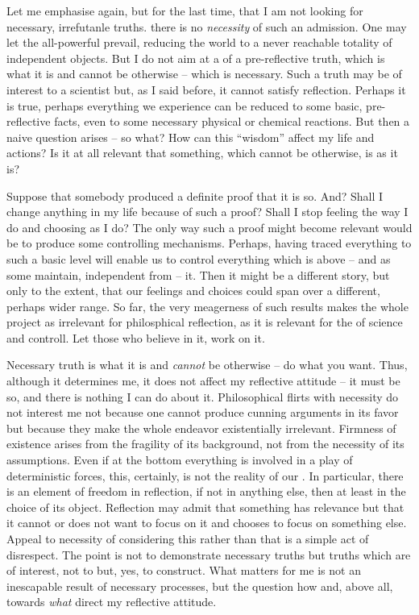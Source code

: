 {\pa
Let me emphasise again, but for the last time, that I am not looking for
necessary, irrefutanle truths. there is no {\em necessity} of such an
admission. One may let the all-powerful  prevail,
reducing the world to a never reachable totality of independent objects. But
I do not aim at a  of a pre-reflective truth, which is
what it is and cannot be otherwise -- which is necessary. Such a truth may be
of interest to a scientist but, as I said before, it cannot satisfy
reflection.  Perhaps it is true, perhaps everything we experience can be
reduced to some basic, pre-reflective facts, even to some necessary physical
or chemical reactions. But then a naive question arises -- so what?  How can
this ``wisdom'' affect my life and actions? Is it at all relevant that
something, which cannot be otherwise, is as it is? 

Suppose that somebody produced a definite proof that it is so. And? Shall I
change anything in my life because of such a proof?  Shall I stop feeling the
way I do and choosing as I do? The only way such a proof might become
relevant would be to produce some controlling mechanisms.  Perhaps, having
traced everything to such a basic level will enable us to control everything
which is above -- and as some maintain, independent from -- it. Then it might
be a different story, but only to the extent, that our feelings and choices
could span over a different, perhaps wider range.  So far, the very
meagerness of such results makes the whole project as irrelevant for
philosphical reflection, as it is relevant for the  of science and controll. Let those who believe in it, work on it.

Necessary truth is what it is and {\em cannot} be otherwise -- do what you
want.  Thus, although it determines me, it does not affect my reflective
attitude -- it must be so, and there is nothing I can do about
it. Philosophical flirts with necessity do not interest me not because one
cannot produce cunning arguments in its favor but because they make the whole
endeavor existentially irrelevant. Firmness of existence arises from the
fragility of its background, not from the necessity of its assumptions.  Even
if at the bottom everything is involved in a play of deterministic forces,
this, certainly, is not the reality of our . In particular, there
is an element of freedom in reflection, if not in anything else, then at
least in the choice of its object. Reflection may admit that something has
relevance but that it cannot or does not want to focus on it and chooses to
focus on something else. Appeal to necessity of considering this rather than
that is a simple act of disrespect. The point is not to demonstrate necessary
truths but truths which are of interest, not to  but, yes,
to construct.  What matters for me is not an inescapable result of necessary
processes, but the question  how and, above all, towards {\em what} direct
my reflective attitude.

}
